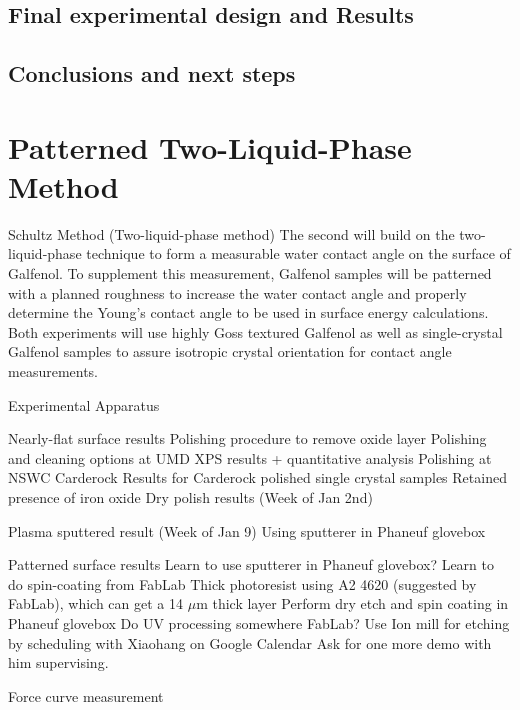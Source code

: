 \documentclass[12pt,letterpaper]{report}
\begin{document}
\section{Final experimental design and Results}\label{section2-3}


\section{Conclusions and next steps}\label{section2-4}



%
%	

%


\chapter{Patterned Two-Liquid-Phase Method}\label{chapter3}



\begin{outline}[enumerate]
\1 Schultz Method (Two-liquid-phase method)
	The second will build on the two-liquid-phase technique to form a measurable water contact angle on the surface of Galfenol. To supplement this measurement, Galfenol samples will be patterned with a planned roughness to increase the water contact angle and properly determine the Young's contact angle to be used in surface energy calculations. Both experiments will use highly Goss textured Galfenol as well as single-crystal Galfenol samples to assure isotropic crystal orientation for contact angle measurements. 
	
	
	\2 Experimental Apparatus
	
	
\1 Nearly-flat surface results
	\2 Polishing procedure to remove oxide layer
		\3 Polishing and cleaning options at UMD
			\4 XPS results + quantitative analysis
		\3 Polishing at NSWC Carderock
	\2 Results for Carderock polished single crystal samples
		\3 Retained presence of iron oxide
	\2 Dry polish results (Week of Jan 2nd)
	
	\2 Plasma sputtered result (Week of Jan 9)
		\3 Using sputterer in Phaneuf glovebox
		
\1 Patterned surface results
	\2 Learn to use sputterer in Phaneuf glovebox?
	\2 Learn to do spin-coating from FabLab
		\3 Thick photoresist using A2 4620 (suggested by FabLab), which can get a 14 $\mu$m thick layer
	\2 Perform dry etch and spin coating in Phaneuf glovebox
	\2 Do UV processing somewhere
		\3 FabLab?
	\2 Use Ion mill for etching by scheduling with Xiaohang on Google Calendar
		\3 Ask for one more demo with him supervising. 
	
\1 Force curve measurement
	
	
	
\end{outline}
\end{document}
